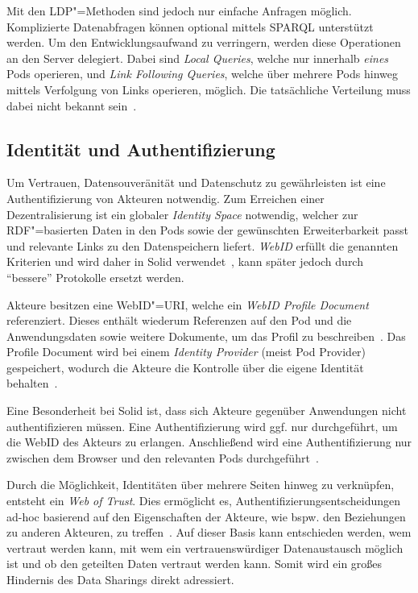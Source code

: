 Mit den LDP"=Methoden sind jedoch nur einfache Anfragen möglich.
Komplizierte Datenabfragen können optional mittels SPARQL unterstützt werden.
Um den Entwicklungsaufwand zu verringern, werden diese Operationen an den Server delegiert.
Dabei sind \emph{Local Queries}, welche nur innerhalb \emph{eines} Pods operieren, und \emph{Link Following Queries}, welche über mehrere Pods hinweg mittels Verfolgung von Links operieren, möglich.
Die tatsächliche Verteilung muss dabei nicht bekannt sein~\cite{sambraSolidPlatformDecentralized2016}.


\subsection{Identität und Authentifizierung}

Um Vertrauen, Datensouveränität und Datenschutz zu gewährleisten ist eine Authentifizierung von Akteuren notwendig.
Zum Erreichen einer Dezentralisierung ist ein globaler \emph{Identity Space} notwendig, welcher zur RDF"=basierten Daten in den Pods sowie der gewünschten Erweiterbarkeit passt und relevante Links zu den Datenspeichern liefert.
\emph{WebID} erfüllt die genannten Kriterien und wird daher in Solid verwendet~\cite{sambraSolidPlatformDecentralized2016}, kann später jedoch durch \enquote{bessere} Protokolle ersetzt werden.

Akteure besitzen eine WebID"=URI, welche ein \emph{WebID Profile Document} referenziert.
Dieses enthält wiederum Referenzen auf den Pod und die Anwendungsdaten sowie weitere Dokumente, um das Profil zu beschreiben~\cite{solidcommunitygroupSolidWebIDProfile2024}.
Das Profile Document wird bei einem \emph{Identity Provider} (meist Pod Provider) gespeichert, wodurch die Akteure die Kontrolle über die eigene Identität behalten~\cite{sambraSolidPlatformDecentralized2016}.

Eine Besonderheit bei Solid ist, dass sich Akteure gegenüber Anwendungen nicht authentifizieren müssen.
Eine Authentifizierung wird ggf. nur durchgeführt, um die WebID des Akteurs zu erlangen.
Anschließend wird eine Authentifizierung nur zwischen dem Browser und den relevanten Pods durchgeführt~\cite{sambraSolidPlatformDecentralized2016}.

Durch die Möglichkeit, Identitäten über mehrere Seiten hinweg zu verknüpfen, entsteht ein \emph{Web of Trust}.
Dies ermöglicht es, Authentifizierungsentscheidungen ad-hoc basierend auf den Eigenschaften der Akteure, wie bspw. den Beziehungen zu anderen Akteuren, zu treffen~\cite{sambraSolidPlatformDecentralized2016}.
Auf dieser Basis kann entschieden werden, wem vertraut werden kann, mit wem ein vertrauenswürdiger Datenaustausch möglich ist und ob den geteilten Daten vertraut werden kann.
Somit wird ein großes Hindernis des Data Sharings direkt adressiert.


